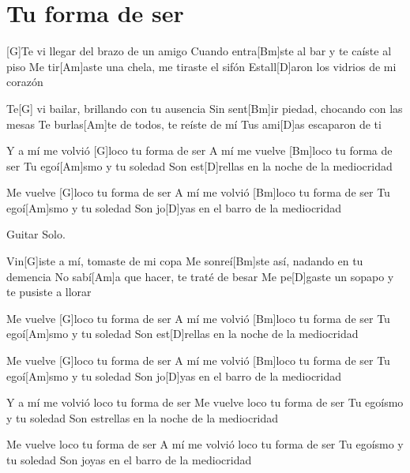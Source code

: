 \section{Tu forma de ser}

\noindent
\chordG
\chordBm
\chordAm
\chordD 

\vspace{1cm}

\begin{guitar}


\begin{multicols}{2}

	[G]Te vi llegar del brazo de un amigo
	Cuando entra[Bm]ste al bar y te caíste al piso
	Me tir[Am]aste una chela, me tiraste el sifón
	Estall[D]aron los vidrios de mi corazón

	Te[G] vi bailar, brillando con tu ausencia
	Sin sent[Bm]ir piedad, chocando con las mesas
	Te burlas[Am]te de todos, te reíste de mí
	Tus ami[D]as escaparon de ti


	\vspace{0.3cm}

	Y a mí me volvió [G]loco tu forma de ser
	A mí me vuelve [Bm]loco tu forma de ser
	Tu egoí[Am]smo y tu soledad
	Son est[D]rellas en la noche de la mediocridad

	Me vuelve [G]loco tu forma de ser
	A mí me volvió [Bm]loco tu forma de ser
	Tu egoí[Am]smo y tu soledad
	Son jo[D]yas en el barro de la mediocridad


	\vspace{0.3cm}

	Guitar Solo.


	\vspace{0.3cm}

	Vin[G]iste a mí, tomaste de mi copa
	Me sonreí[Bm]ste así, nadando en tu demencia
	No sabí[Am]a que hacer, te traté de besar
	Me pe[D]gaste un sopapo y te pusiste a llorar

	\vspace{0.3cm}

	Me vuelve [G]loco tu forma de ser
	A mí me volvió [Bm]loco tu forma de ser
	Tu egoí[Am]smo y tu soledad
	Son est[D]rellas en la noche de la mediocridad

	Me vuelve [G]loco tu forma de ser
	A mí me volvió [Bm]loco tu forma de ser
	Tu egoí[Am]smo y tu soledad
	Son jo[D]yas en el barro de la mediocridad

	\vspace{0.3cm}

	Y a mí me volvió loco tu forma de ser
	Me vuelve loco tu forma de ser
	Tu egoísmo y tu soledad
	Son estrellas en la noche de la mediocridad

	Me vuelve loco tu forma de ser
	A mí me volvió loco tu forma de ser
	Tu egoísmo y tu soledad
	Son joyas en el barro de la mediocridad

\end{multicols}

\end{guitar}
